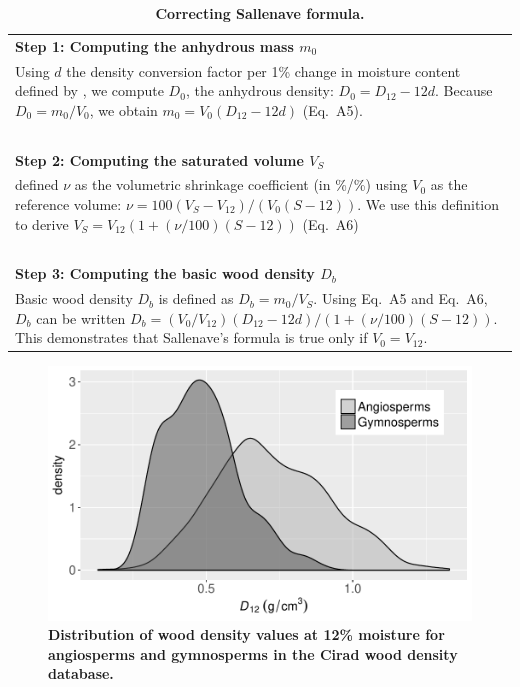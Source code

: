 \documentclass[a4paper, 12pt, leqno, dvipsnames]{article}\usepackage[]{graphicx}\usepackage[]{color}
\begin{document}
\begin{longtable}{@{}L{\textwidth}@{}}
  \caption{\textbf{Correcting Sallenave formula.}}\label{sm:Correction}\\
  \textbf{Step 1: Computing the anhydrous mass $m_0$}\\
  Using $d$ the density conversion factor per 1\% change in moisture content defined by \citet{Sallenave1955},
  we compute $D_0$, the anhydrous density: $D_0=D_{12}-12d$.
  Because $D_0=m_0/V_0$, we obtain $m_0=V_0 (D_{12}-12d)$ (Eq.~A5).\\
  ~\\
  \textbf{Step 2: Computing the saturated volume $V_S$}\\
  \citet{Sallenave1955} defined $\nu$ as the volumetric shrinkage coefficient (in \%/\%) using $V_0$
  as the reference volume: $\nu=100(V_S-V_{12})/(V_0 (S-12))$.
  We use this definition to derive $V_S=V_{12}(1+(\nu/100)(S-12))$ (Eq.~A6)\\
  ~\\
  \textbf{Step 3: Computing the basic wood density $D_b$}\\
  Basic wood density $D_b$ is defined as $D_b=m_0/V_S$. Using Eq.~A5 and Eq.~A6, $D_b$ can
  be written $D_b=(V_0/V_{12})(D_{12}-12d)/(1+(\nu/100)(S-12))$.
  This demonstrates that Sallenave's formula is true only if $V_0=V_{12}$.\\
\end{longtable}

\newpage

\setcounter{figure}{2}
\renewcommand{\figurename}{Supporting Information}
\renewcommand{\thefigure}{S\arabic{figure}}

\begin{figure}[!ht] 
    \begin{center} 

      \caption{\textbf{Distribution of wood density values at 12\% moisture for angiosperms
      and gymnosperms in the Cirad wood density database.}}\label{fig:dist-angio-gymn}
      \vspace{1cm}
      \includegraphics[width=12cm]{figs/density_D12_clade.pdf}
      
    \end{center}
\end{figure}
\end{document}
